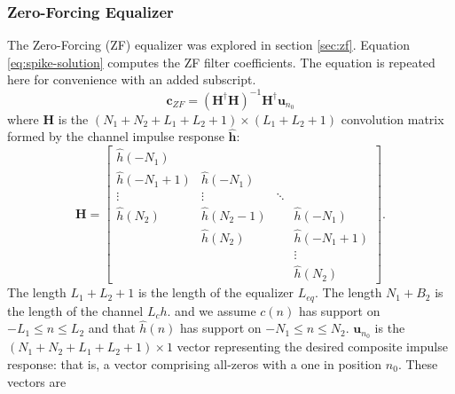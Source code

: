 \subsubsection{Zero-Forcing Equalizer}
The Zero-Forcing (ZF) equalizer was explored in section \ref{sec:zf}.
Equation \eqref{eq:spike-solution} computes the ZF filter coefficients.
The equation is repeated here for convenience with an added subscript.
\begin{equation}
	\mathbf{c}_{ZF} = \left( \mathbf{H}^\dag\mathbf{H}\right)^{-1}\mathbf{H}^\dag\mathbf{u}_{n_0}
	\label{eq:jeff-spike-solution}
\end{equation}
where $\mathbf{H}$ is the $(N_1+N_2+L_1+L_2+1)\times (L_1+L_2+1)$
convolution matrix formed by the channel impulse response $\hat{\mathbf{h}}$:
\begin{equation}
	\mathbf{H} = \begin{bmatrix}
		\hat{h}(-N_1) 	&  &  & \\
		\hat{h}(-N_1+1) & \hat{h}(-N_1) & & \\
		\vdots & \vdots & \ddots & \\
		\hat{h}(N_2) 	& \hat{h}(N_2-1) & & \hat{h}(-N_1)\\
		       & \hat{h}(N_2) & & \hat{h}(-N_1+1) \\
		       &        & & \vdots \\
		       &        & & \hat{h}(N_2)
		\end{bmatrix}.
\label{eq:jeff-zf-H-matrix}
\end{equation}
The length $L_1+L_2+1$ is the length of the equalizer $L_{eq}$.
The length $N_1+B_2$ is the length of the channel $L_ch$.
and we assume $c(n)$ has support on $-L_1 \leq n \leq L_2$ and that $\hat{h}(n)$
has support on $-N_1 \leq n \leq N_2$.
$\mathbf{u}_{n_0}$ is the $(N_1+N_2+L_1+L_2+1) \times 1$
vector representing the desired composite impulse response:
that is, a vector comprising all-zeros with a one in position $n_0$.
These vectors are
